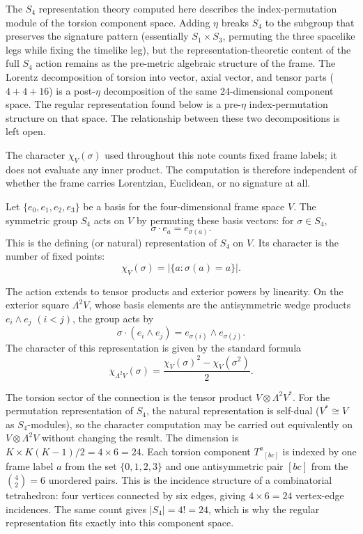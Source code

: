 \documentclass[11pt]{article}
\begin{document}
The $S_4$ representation theory computed here describes the
index-permutation module of the torsion component space.  Adding
$\eta$ breaks $S_4$ to the subgroup that preserves the signature
pattern (essentially $S_1\times S_3$, permuting the three
spacelike legs while fixing the timelike leg), but the
representation-theoretic content of the full $S_4$ action remains
as the pre-metric algebraic structure of the frame.  The Lorentz
decomposition of torsion into vector, axial vector, and tensor
parts ($4+4+16$) is a post-$\eta$ decomposition of the same
24-dimensional component space.  The regular representation found
below is a pre-$\eta$ index-permutation structure on that space.
The relationship between these two decompositions is left open.

The character $\chi_V(\sigma)$ used throughout this note counts
fixed frame labels; it does not evaluate any inner product.  The
computation is therefore independent of whether the frame carries
Lorentzian, Euclidean, or no signature at all.

Let $\{e_0,e_1,e_2,e_3\}$ be a basis for the four-dimensional
frame space $V$.  The symmetric group $S_4$ acts on $V$ by
permuting these basis vectors: for $\sigma\in S_4$,
\[
        \sigma\cdot e_a = e_{\sigma(a)}.
\]
This is the defining (or natural) representation of $S_4$ on $V$.
Its character is the number of fixed points:
\[
        \chi_V(\sigma) = |\{a : \sigma(a)=a\}|.
\]

The action extends to tensor products and exterior powers by
linearity.  On the exterior square $\Lambda^2V$, whose basis
elements are the antisymmetric wedge products $e_i\wedge e_j$
$(i<j)$, the group acts by
\[
        \sigma\cdot(e_i\wedge e_j)
        = e_{\sigma(i)}\wedge e_{\sigma(j)}.
\]
The character of this representation is given by the standard
formula~\cite{FultonHarris}
\[
        \chi_{\Lambda^2V}(\sigma)
        = \frac{\chi_V(\sigma)^2 - \chi_V(\sigma^2)}{2}.
\]

The torsion sector of the connection is the tensor product
$V\otimes\Lambda^2V^*$.  For the permutation representation of
$S_4$, the natural representation is self-dual ($V^*\cong V$ as
$S_4$-modules), so the character computation may be carried out
equivalently on $V\otimes\Lambda^2V$ without changing the result.
The dimension is $K\times K(K-1)/2 = 4\times 6 = 24$.  Each
torsion component $T^a{}_{[bc]}$ is indexed by one frame label $a$
from the set $\{0,1,2,3\}$ and one antisymmetric pair $[bc]$ from
the $\binom{4}{2}=6$ unordered pairs.  This is the incidence
structure of a combinatorial tetrahedron: four vertices connected
by six edges, giving $4\times 6=24$ vertex-edge incidences.  The
same count gives $|S_4|=4!=24$, which is why the regular
representation fits exactly into this component space.
\end{document}
